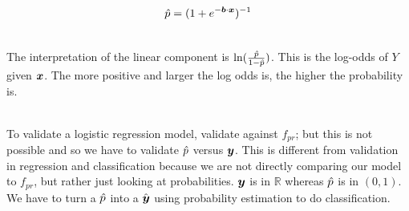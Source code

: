 \documentclass[12pt]{article}
\begin{document}
\begin{enumerate}
$$ \hat{p} = (1 + e^{-\boldsymbol{b} \cdot \boldsymbol{x}})^{-1} $$ 

 \\
The interpretation of the linear component is $\ln (\frac{\hat{p}}{1-\hat{p}})$. This is the log-odds of $Y$ given $\boldsymbol{x}$. The more positive and larger the log odds is, the higher the probability is. 

 \\
To validate a logistic regression model, validate against $f_{pr}$; but this is not possible and so we have to validate $\hat{p}$ versus $\boldsymbol{y}$. This is different from validation in regression and classification because we are not directly comparing our model to $f_{pr}$, but rather just looking at probabilities. $\boldsymbol{y}$ is in $\mathbb{R}$ whereas $\hat{p}$ is in $(0,1)$. We have to turn a $\hat{p}$ into a $\hat{\boldsymbol{y}}$ using probability estimation to do classification. 

\end{enumerate}


\end{document}
